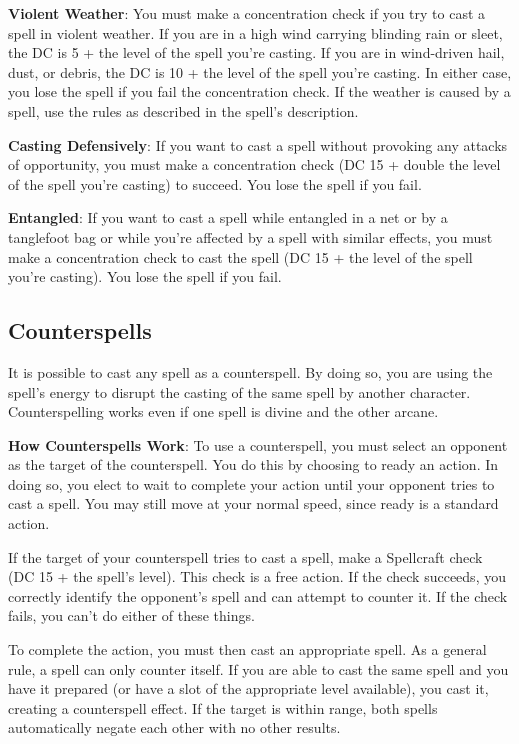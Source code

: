 \textbf{Violent Weather}: You must make a concentration check if you try to cast a spell in violent weather. If you are in a high wind carrying blinding rain or sleet, the DC is 5 + the level of the spell you're casting. If you are in wind-driven hail, dust, or debris, the DC is 10 + the level of the spell you're casting. In either case, you lose the spell if you fail the concentration check. If the weather is caused by a spell, use the rules as described in the spell's description.
				
\textbf{Casting Defensively}: If you want to cast a spell without provoking any attacks of opportunity, you must make a concentration check (DC 15 + double the level of the spell you're casting) to succeed. You lose the spell if you fail.
				
\textbf{Entangled}: If you want to cast a spell while entangled in a net or by a tanglefoot bag or while you're affected by a spell with similar effects, you must make a concentration check to cast the spell (DC 15 + the level of the spell you're casting). You lose the spell if you fail.
				
\subsection{Counterspells}

				
It is possible to cast any spell as a counterspell. By doing so, you are using the spell's energy to disrupt the casting of the same spell by another character. Counterspelling works even if one spell is divine and the other arcane.
				
\textbf{How Counterspells Work}: To use a counterspell, you must select an opponent as the target of the counterspell. You do this by choosing to ready an action. In doing so, you elect to wait to complete your action until your opponent tries to cast a spell. You may still move at your normal speed, since ready is a standard action.
				
If the target of your counterspell tries to cast a spell, make a Spellcraft check (DC 15 + the spell's level). This check is a free action. If the check succeeds, you correctly identify the opponent's spell and can attempt to counter it. If the check fails, you can't do either of these things.
				
To complete the action, you must then cast an appropriate spell. As a general rule, a spell can only counter itself. If you are able to cast the same spell and you have it prepared (or have a slot of the appropriate level available), you cast it, creating a counterspell effect. If the target is within range, both spells automatically negate each other with no other results.
				
